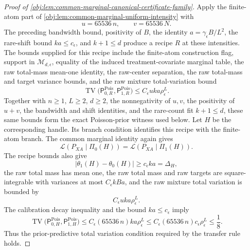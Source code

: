 \begin{proof}[Proof of \cref{obj:lem:common-marginal-canonical-certificate-family}]
Apply the finite-atom part of \cref{obj:lem:common-marginal-uniform-intensity} with
\[
u=65536\,n,\qquad v=65536\,N.
\]
The preceding bandwidth bound, positivity of \(B\), the identity \(a=\gamma_\epsilon B/L^2\), the rare-shift bound \(ka\le c_\epsilon\), and \(k+1\le d\) produce a recipe \(R\) at these intensities.  The bounds supplied for this recipe include the finite-atom construction flag, support in \(\mathcal M_{d,\epsilon}\), equality of the induced treatment-covariate marginal table, the raw total-mass mean-one identity, the raw-center separation, the raw total-mass and target variance bounds, and the raw mixture total-variation bound
\[
\operatorname{TV}
\bigl(\mathsf P_{0,R}^{\mathrm{Pois}},\mathsf P_{1,R}^{\mathrm{Pois}}\bigr)
\le
C_\epsilon u k a \rho_\epsilon^L.
\]
Together with \(n\ge1\), \(L\ge2\), \(d\ge2\), the nonnegativity of \(u,v\), the positivity of \(u+v\), the bandwidth and shift identities, and the rare-count fit \(k+1\le d\), these same bounds form the exact Poisson-prior witness used below.  Let \(H\) be the corresponding handle.  Its branch condition identifies this recipe with the finite-atom branch.  The common marginal identity again gives
\[
\mathcal L(P_{XA}\mid \Pi_0(H))
=
\mathcal L(P_{XA}\mid \Pi_1(H)).
\]
The recipe bounds also give
\[
\left|\theta_1(H)-\theta_0(H)\right|
\ge
c_\epsilon ka
=
\Delta_H,
\]
the raw total mass has mean one, the raw total mass and raw targets are square-integrable with variances at most \(C_\epsilon kBa\), and the raw mixture total variation is bounded by
\[
C_\epsilon u k a\rho_\epsilon^L.
\]
The calibration decay inequality and the bound \(ka\le c_\epsilon\) imply
\[
\operatorname{TV}
\bigl(\mathsf P_{0,H}^{\mathrm{Pois}},\mathsf P_{1,H}^{\mathrm{Pois}}\bigr)
\le
C_\epsilon(65536\,n)ka\rho_\epsilon^L
\le
C_\epsilon(65536\,n)c_\epsilon\rho_\epsilon^L
\le
\frac18 .
\]
Thus the prior-predictive total variation condition required by the transfer rule holds. %


\end{proof}
